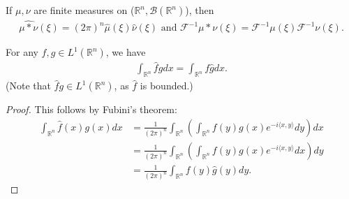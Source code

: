 \begin{theorem}
    If \(\mu,\nu\) are finite measures on (\(\mathbb{R}^n, \mathscr{B}(\mathbb{R}^n)\)), then
    \begin{align*}
        \widehat{\mu\ast \nu}(\xi) = (2\pi)^n \hat{\mu}(\xi)\hat{\nu}(\xi) \text{ and } \mathcal{F}^{-1} \mu\ast\nu(\xi) = \mathcal{F}^{-1}\mu(\xi)\mathcal{F}^{-1}\nu(\xi).
    \end{align*}
\end{theorem}
\begin{lemma}
    For any \(f,g\in L^1(\mathbb{R}^n)\), we have 
    \begin{align*}
        \int_{\mathbb{R}^n} \hat{f}gdx = \int_{\mathbb{R}^n}f\hat{g}dx. 
    \end{align*}
    (Note that \(\hat{f}g\in L^1(\mathbb{R}^n)\), as \(\hat{f}\) is bounded.)
\end{lemma}
\ifdetailed 
\begin{proof}
    This follows by Fubini's theorem:
    \begin{align*}
        \int_{\mathbb{R}^n} \hat{f}(x)g(x) dx &= \frac{1}{(2\pi)^n}\int_{\mathbb{R}^n}\left(\int_{\mathbb{R}^n}f(y)g(x)e^{-i\langle x,y\rangle}dy\right) dx \\
        &=\frac{1}{(2\pi)^n}\int_{\mathbb{R}^n}\left(\int_{\mathbb{R}^n}f(y)g(x)e^{-i\langle x,y\rangle}dx\right) dy \\
        &= \frac{1}{(2\pi)^n}\int_{\mathbb{R}^n}f(y)\hat{g}(y)dy.
    \end{align*}
\end{proof}
